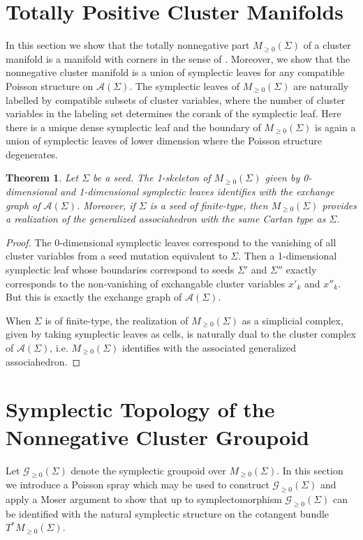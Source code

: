 \documentclass{amsart}
\newtheorem{theorem}{Theorem}[section]
\newcommand{\cA}{\mathcal{A}}
\newcommand{\cG}{\mathcal{G}}
\begin{document}
\section{Totally Positive Cluster Manifolds}
In this section we show that the totally nonnegative part $M_{\ge0}(\Sigma)$ of a cluster manifold is a manifold with corners in the sense of \cite{MR3077259}.  
Moreover, we show that the nonnegative cluster manifold is a union of symplectic leaves for any compatible Poisson structure on $\cA(\Sigma)$.  
The symplectic leaves of $M_{\ge0}(\Sigma)$ are naturally labelled by compatible subsets of cluster variables, where the number of cluster variables in the labeling set determines the corank of the symplectic leaf.
Here there is a unique dense symplectic leaf and the boundary of $M_{\ge0}(\Sigma)$ is again a union of symplectic leaves of lower dimension where the Poisson structure degenerates.

\begin{theorem}
  Let $\Sigma$ be a seed.  
  The 1-skeleton of $M_{\ge0}(\Sigma)$ given by 0-dimensional and 1-dimensional symplectic leaves identifies with the exchange graph of $\cA(\Sigma)$.  
  Moreover, if $\Sigma$ is a seed of finite-type, then $M_{\ge0}(\Sigma)$ provides a realization of the generalized associahedron with the same Cartan type as $\Sigma$.
\end{theorem}
\begin{proof}
  The 0-dimensional symplectic leaves correspond to the vanishing of all cluster variables from a seed mutation equivalent to $\Sigma$.  
  Then a 1-dimensional symplectic leaf whose boundaries correspond to seeds $\Sigma'$ and $\Sigma''$ exactly corresponds to the non-vanishing of exchangable cluster variables $x'_k$ and $x''_k$.
  But this is exactly the exchange graph of $\cA(\Sigma)$.

  When $\Sigma$ is of finite-type, the realization of $M_{\ge0}(\Sigma)$ as a simplicial complex, given by taking symplectic leaves as cells, is naturally dual to the cluster complex of $\cA(\Sigma)$, i.e. $M_{\ge0}(\Sigma)$ identifies with the associated generalized associahedron.
\end{proof}

\section{Symplectic Topology of the Nonnegative Cluster Groupoid}
Let $\cG_{\ge0}(\Sigma)$ denote the symplectic groupoid over $M_{\ge0}(\Sigma)$.  
In this section we introduce a Poisson spray which may be used to construct $\cG_{\ge0}(\Sigma)$ and apply a Moser argument to show that up to symplectomorphism $\cG_{\ge0}(\Sigma)$ can be identified with the natural symplectic structure on the cotangent bundle $T^*M_{\ge0}(\Sigma)$.
\end{document}
